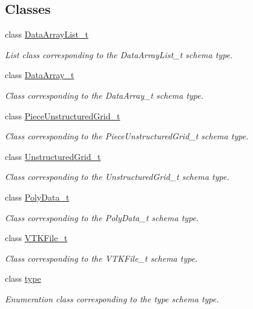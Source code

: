 \subsection*{Classes}
\begin{DoxyCompactItemize}
\item 
class \hyperlink{classDataArrayList__t}{Data\+Array\+List\+\_\+t}
\begin{DoxyCompactList}\small\item\em List class corresponding to the Data\+Array\+List\+\_\+t schema type. \end{DoxyCompactList}\item 
class \hyperlink{classDataArray__t}{Data\+Array\+\_\+t}
\begin{DoxyCompactList}\small\item\em Class corresponding to the Data\+Array\+\_\+t schema type. \end{DoxyCompactList}\item 
class \hyperlink{classPieceUnstructuredGrid__t}{Piece\+Unstructured\+Grid\+\_\+t}
\begin{DoxyCompactList}\small\item\em Class corresponding to the Piece\+Unstructured\+Grid\+\_\+t schema type. \end{DoxyCompactList}\item 
class \hyperlink{classUnstructuredGrid__t}{Unstructured\+Grid\+\_\+t}
\begin{DoxyCompactList}\small\item\em Class corresponding to the Unstructured\+Grid\+\_\+t schema type. \end{DoxyCompactList}\item 
class \hyperlink{classPolyData__t}{Poly\+Data\+\_\+t}
\begin{DoxyCompactList}\small\item\em Class corresponding to the Poly\+Data\+\_\+t schema type. \end{DoxyCompactList}\item 
class \hyperlink{classVTKFile__t}{V\+T\+K\+File\+\_\+t}
\begin{DoxyCompactList}\small\item\em Class corresponding to the V\+T\+K\+File\+\_\+t schema type. \end{DoxyCompactList}\item 
class \hyperlink{classtype}{type}
\begin{DoxyCompactList}\small\item\em Enumeration class corresponding to the type schema type. \end{DoxyCompactList}\item 

\end{DoxyCompactItemize}
